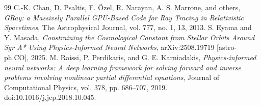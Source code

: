 \documentclass[12pt]{article}
\begin{document}
\begin{itemize}
\begin{thebibliography}{99}
\cite{vincent2011}
C.-K. Chan, D. Psaltis, F. Özel, R. Narayan, A. S. Marrone,
and others,
\textit{GRay: a Massively Parallel GPU-Based Code for Ray Tracing in Relativistic Spacetimes},
The Astrophysical Journal, vol. 777, no. 1, 13, 2013.
\cite{chan2013}
S. Eyama and Y. Masada,
\textit{Constraining the Cosmological Constant from Stellar Orbits Around Sgr A* Using Physics-Informed Neural Networks},
arXiv:2508.19719 [astro-ph.CO], 2025.
\cite{eyama2025}
M. Raissi, P. Perdikaris, and G. E. Karniadakis,
\textit{Physics-informed neural networks: A deep learning framework for
solving forward and inverse problems involving nonlinear partial
differential equations},
Journal of Computational Physics, vol. 378, pp. 686--707, 2019.
doi:10.1016/j.jcp.2018.10.045.
\cite{raissi2019}
\end{thebibliography}
\end{itemize}
\end{document}
